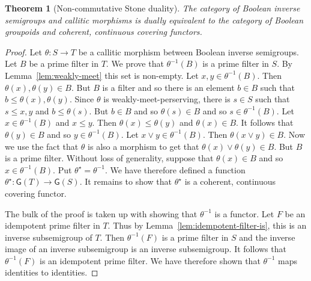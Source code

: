 \documentclass[a4paper]{amsart}
\newtheorem{theorem}{Theorem}[section]
\begin{document}
\begin{theorem}[Non-commutative Stone duality]\label{them:non-com-stone} The category of Boolean inverse semigroups and callitic morphisms
is dually equivalent to the category of Boolean groupoids and coherent, continuous covering functors.
\end{theorem}
\begin{proof} Let $\theta \colon S \rightarrow T$ be a callitic morphism between Boolean inverse semigroups.
Let $B$ be a prime filter in $T$.
We prove that $\theta^{-1}(B)$ is a prime filter in $S$.
By Lemma~\ref{lem:weakly-meet} this set is non-empty.
Let $x,y \in \theta^{-1}(B)$.
Then $\theta (x), \theta (y) \in B$.
But $B$ is a filter and so there is an element $b \in B$ such that
$b \leq \theta (x), \theta (y)$.
Since $\theta$ is weakly-meet-perserving, 
there is $s \in S$ such that $s \leq x,y$ and $b \leq \theta (s)$.
But $b \in B$ and so $\theta (s) \in B$ and so $s \in \theta^{-1}(B)$.
Let $x \in \theta^{-1}(B)$ and $x \leq y$.
Then $\theta (x) \leq \theta (y)$ and $\theta (x) \in B$.
It follows that $\theta (y) \in B$ and so $y \in \theta^{-1}(B)$.
Let $x \vee y \in \theta^{-1}(B)$.
Then $\theta (x \vee y) \in B$.
Now we use the fact that $\theta$ is also a morphism to get that $\theta (x) \vee \theta (y) \in B$.
But $B$ is a prime filter.
Without loss of generality, suppose that $\theta (x) \in B$ and so $x \in \theta^{-1}(B)$.
Put $\theta^{\star} = \theta^{-1}$.
We have therefore defined a function
$\theta^{\star} \colon \mathsf{G}(T) \rightarrow \mathsf{G}(S)$.
It remains to show that $\theta^{\star}$ is a coherent, continuous covering functor.

The bulk of the proof is taken up with showing that $\theta^{-1}$ is a functor.
Let $F$ be an idempotent prime filter in $T$.
Thus by Lemma~\ref{lem:idempotent-filter-is},
this is an inverse subsemigroup of $T$.
Then $\theta^{-1}(F)$ is a prime filter in $S$
and the inverse image of an inverse subsemigroup is an inverse subsemigroup.
It follows that $\theta^{-1}(F)$ is an idempotent prime filter.
We have therefore shown that $\theta^{-1}$ maps identities to identities.


\end{proof}
\end{document}
